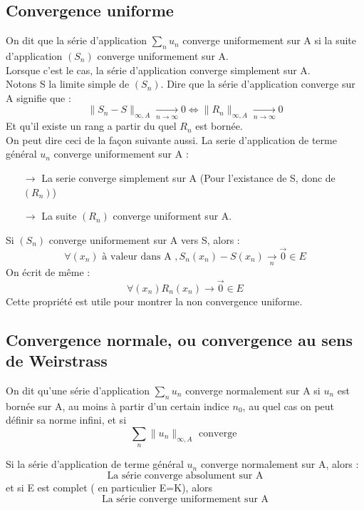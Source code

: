 \subsection{Convergence uniforme}
\begin{de}
On dit que la série d'application $\underset{n} \sum u_n$ converge uniformement sur A si la suite d'application $(S_n)$ converge uniformement sur A.\\
Lorsque c'est le cas, la série d'application converge simplement sur A.\\
Notons S la limite simple de $(S_n)$. Dire que la série d'application converge sur A signifie que : 
$$\parallel S_n - S \parallel_{\infty,A} \underset{n \rightarrow \infty}\rightarrow 0 \Leftrightarrow \parallel R_n \parallel_{\infty,A} \underset{n \rightarrow \infty}\rightarrow 0$$
Et qu'il existe un rang a partir du quel $R_n$ est bornée.\\
On peut dire ceci de la façon suivante aussi. La serie d'application de terme général $u_n$ converge uniformement sur A : 
\begin{itemize}
 \item[$\rightarrow$] La serie converge simplement sur A (Pour l'existance de S, donc de $(R_n)$)
 \item[$\rightarrow$] La suite $(R_n)$ converge uniforment sur A.
\end{itemize}
\end{de}
\begin{prop}
Si $(S_n)$ converge uniformement sur A vers S, alors :
$$\forall (x_n) \mbox{ à valeur dans A }, S_n(x_n) - S(x_n) \underset{n}\rightarrow \overrightarrow{0} \in E$$
On écrit de même : 
$$\forall (x_n) R_n(x_n) \rightarrow \overrightarrow{0} \in E$$
Cette propriété est utile pour montrer la non convergence uniforme.\\
\end{prop}
\subsection{Convergence normale, ou convergence au sens de Weirstrass}
\begin{de}
On dit qu'une série d'application $\underset{n} \sum u_n$ converge normalement sur A si $u_n$ est bornée sur A, au moins à partir d'un certain indice $n_0$, au quel cas on peut définir sa norme infini, et si 
$$\sum_n \parallel u_n \parallel_{\infty,A} \mbox{ converge }$$
\end{de}
\begin{prop}
Si la série d'application de terme général $u_n$ converge normalement sur A, alors :\\
$$\mbox{La série converge absolument sur A}$$
et si E est complet ( en particulier E=K), alors
$$ \mbox{La série converge uniformement sur A}$$
\end{prop}

